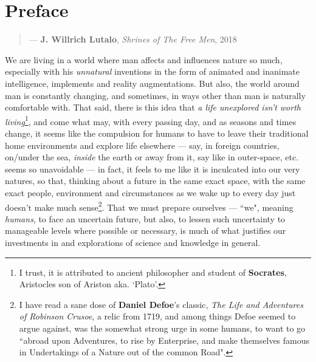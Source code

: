 \documentclass[a4paper, 18pt]{book} %
\begin{document}
\chapter{Preface}
\label{SECPREFACE}


\noindent
\begin{minipage}{1\textwidth}
\vspace{1em}
\begin{quotation}
\hspace*{\fill} --- \textbf{J. Willrich Lutalo}, \textit{Shrines of The Free Men}, 2018\cite{shrinesjwl}
\end{quotation}
\vspace{1em}
\end{minipage}

\vspace{1em}



We are living in a world where man affects and influences nature so much, especially with his \textit{unnatural} inventions in the form of animated and inanimate intelligence, implements and reality augmentations. But also, the world around man is constantly changing, and sometimes, in ways other than man is naturally comfortable with. That said, there is this idea that \textit{a life unexplored isn't worth living}\footnote{I trust, it is attributed to ancient philosopher and student of \textbf{Socrates}, Aristocles son of Ariston aka. `Plato'.}, and come what may, with every passing day, and as seasons and times change, it seems like the compulsion for humans to have to leave their traditional home environments and explore life elsewhere --- say, in foreign countries, on/under the sea, \textit{inside} the earth or away from it, say like in outer-space, etc. seems so unavoidable --- in fact, it feels to me like it is inculcated into our very natures, so that, thinking about a future in the same exact space, with the same exact people, environment and circumstances as we wake up to every day just doesn't make much sense\footnote{I have read a sane dose of \textbf{Daniel Defoe}'s classic, \textit{The Life and Adventures of Robinson Crusoe}, a relic from 1719, and among things Defoe seemed to argue against, was the somewhat strong urge in some humans, to want to go ``abroad upon Adventures, to rise by Enterprise, and make themselves famous in Undertakings of a Nature out of the common Road".}. That we must prepare ourselves --- ``we", meaning \textit{humans}, to face an uncertain future, but also, to lessen such uncertainty to manageable levels where possible or necessary, is much of what justifies our investments in and explorations of science and knowledge in general. 
\end{document}
